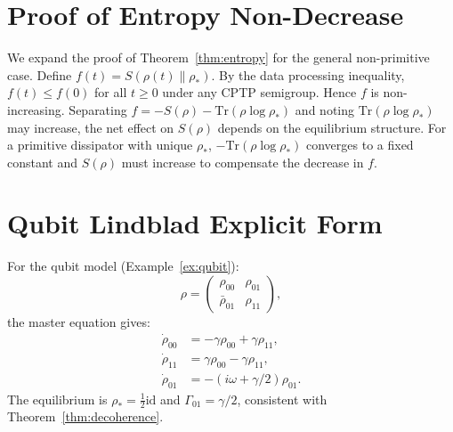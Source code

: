 \documentclass[twocolumn,aps,prd,superscriptaddress,nofootinbib]{revtex4-2}
\newcommand{\Tr}{\mathrm{Tr}}
\newcommand{\id}{\mathrm{id}}
\begin{document}
\section{Proof of Entropy Non-Decrease}
\label{app:entropy}

We expand the proof of Theorem~\ref{thm:entropy} for the general non-primitive case.
Define $f(t) = S(\rho(t)\|\rho_*)$.  By the data processing inequality, $f(t) \leq f(0)$ for all $t \geq 0$ under any CPTP semigroup.  Hence $f$ is non-increasing.  Separating $f = -S(\rho) - \Tr(\rho\log\rho_*)$ and noting $\Tr(\rho\log\rho_*)$ may increase, the net effect on $S(\rho)$ depends on the equilibrium structure.  For a primitive dissipator with unique $\rho_*$, $-\Tr(\rho\log\rho_*)$ converges to a fixed constant and $S(\rho)$ must increase to compensate the decrease in $f$.

\section{Qubit Lindblad Explicit Form}
\label{app:qubit}

For the qubit model (Example~\ref{ex:qubit}):
\[
  \rho = \begin{pmatrix}\rho_{00} & \rho_{01}\\ \bar\rho_{01} & \rho_{11}\end{pmatrix},
\]
the master equation gives:
\begin{align}
  \dot\rho_{00} &= -\gamma\rho_{00} + \gamma\rho_{11}, \\
  \dot\rho_{11} &= \gamma\rho_{00} - \gamma\rho_{11}, \\
  \dot\rho_{01} &= -(i\omega + \gamma/2)\rho_{01}.
\end{align}
The equilibrium is $\rho_* = \frac12\id$ and $\Gamma_{01} = \gamma/2$, consistent with Theorem~\ref{thm:decoherence}.


\end{document}
